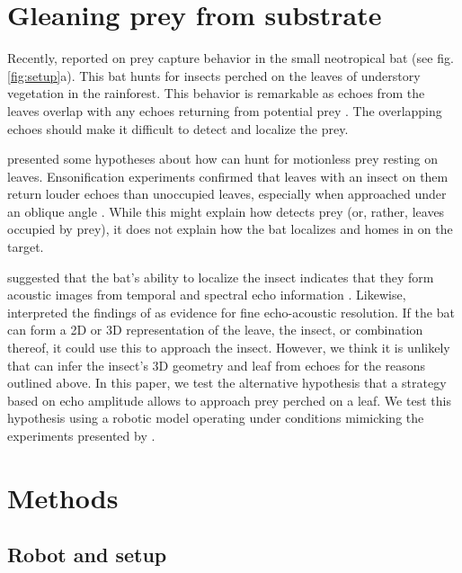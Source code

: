 \documentclass[letterpaper]{article}
\begin{document}
\section{Gleaning prey from substrate}

Recently, \citet{Geipel2013, Geipel2019} reported on prey capture behavior in the small neotropical bat  (see fig. \ref{fig:setup}a). This bat hunts for insects perched on the leaves of understory vegetation in the rainforest. This behavior is remarkable as echoes from the leaves overlap with any echoes returning from potential prey \citep{Jones2013}. The overlapping echoes should make it difficult to detect and localize the prey. 

\citet{Geipel2013, Geipel2019} presented some hypotheses about how  can hunt for motionless prey resting on leaves. Ensonification experiments confirmed that leaves with an insect on them return louder echoes than unoccupied leaves, especially when approached under an oblique angle \citep{Geipel2019}. While this might explain how  detects prey (or, rather, leaves occupied by prey), it does not explain how the bat localizes and homes in on the target.

\citet{Geipel2013} suggested that the bat's ability to localize the insect indicates that they form acoustic images from temporal and spectral
echo information \citep[see also][]{Geipel2007,Jones2013}. Likewise, \citet{Simon2014} interpreted the findings of \citet{Geipel2013} as evidence for fine echo-acoustic resolution. If the bat can form a 2D or 3D representation of the leave, the insect, or combination thereof, it could use this to approach the insect. However, we think it is unlikely that  can infer the insect's 3D geometry and leaf from echoes for the reasons outlined above. In this paper, we test the alternative hypothesis that a strategy based on echo amplitude allows  to approach prey perched on a leaf. We test this hypothesis using a robotic model operating under conditions mimicking the experiments presented by \citet{Geipel2013, Geipel2019}. 

\section{Methods}

\subsection{Robot and setup}
\end{document}
